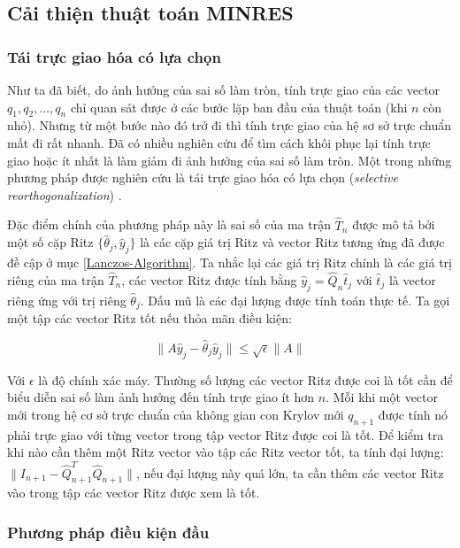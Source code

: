 \documentclass[14pt, a4paper]{article}
\numberwithin{equation}{section}
\numberwithin{algorithm}{section}
\numberwithin{figure}{section}
\numberwithin{dl}{section}
\numberwithin{md}{section}
\numberwithin{bd}{section}
\numberwithin{dn}{section}
\begin{document}
\subsection{Cải thiện thuật toán MINRES}

\subsubsection{Tái trực giao hóa có lựa chọn}

Như ta đã biết, do ảnh hưởng của sai số làm tròn, tính trực giao của các vector $q_1, q_2, \dots, q_n$ chỉ quan sát được ở các bước lặp ban đầu của thuật toán (khi $n$ còn nhỏ). Nhưng từ một bước nào đó trở đi thì tính trực giao của hệ sơ sở trực chuẩn mất đi rất nhanh.
Đã có nhiều nghiên cứu để tìm cách khôi phục lại tính trực giao hoặc ít nhất là làm giảm đi ảnh hưởng của sai số làm tròn.
Một trong những phương pháp được nghiên cứu là tái trực giao hóa có lựa chọn (\textit{selective reorthogonalization}) \cite{parlett1979lanczos}.

Đặc điểm chính của phương pháp này là sai số của ma trận $\hat{T}_n$ được mô tả bởi một số cặp Ritz $\lbrace \hat{\theta}_j, \hat{y}_j \rbrace$ là các cặp giá trị Ritz và vector Ritz tương ứng đã được đề cập ở mục \ref{Lanczos-Algorithm}. Ta nhắc lại các giá trị Ritz chính là các giá trị riêng của ma trận $\hat{T}_n$, các vector Ritz được tính bằng $\hat{y}_j =\hat{Q}_n \hat{t}_j$ với $\hat{t}_j$ là vector riêng ứng với trị riêng $\hat{\theta}_j$. Dấu mũ là các đại lượng được tính toán thực tế.
Ta gọi một tập các vector Ritz tốt nếu thỏa mãn điều kiện:

\begin{equation}
    \lVert A \hat{y}_j - \hat{\theta}_j \hat{y}_j \rVert \leq \sqrt{\epsilon} \lVert A \rVert
\end{equation}

Với $\epsilon$ là độ chính xác máy.
Thường số lượng các vector Ritz được coi là tốt cần để biểu diễn sai số làm ảnh hưởng đến tính trực giao ít hơn $n$. Mỗi khi một vector mới trong hệ cơ sở trực chuẩn của không gian con Krylov mới $q_{n+1}$ được tính nó phải trực giao với từng vector trong tập vector Ritz được coi là tốt. Để kiểm tra khi nào cần thêm một Ritz vector vào tập các Ritz vector tốt, ta tính đại lượng:
$\lVert I_{n+1} - \hat{Q}_{n+1}^T \hat{Q}_{n+1} \rVert$, nếu đại lượng này quá lớn, ta cần thêm các vector Ritz vào trong tập các vector Ritz được xem là tốt.

\subsubsection{Phương pháp điều kiện đầu}
\end{document}
